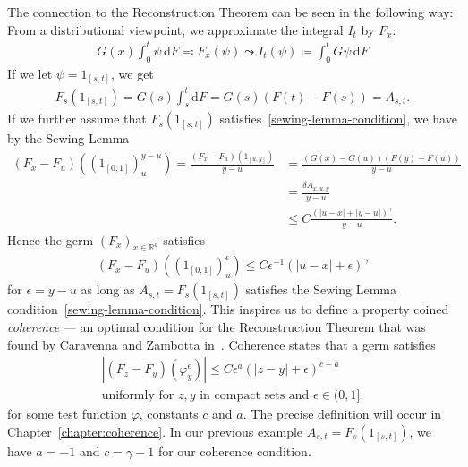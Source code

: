 The connection to the Reconstruction Theorem can be seen in the following way: From a distributional viewpoint, we approximate the integral \(I_t\) by \(F_x\): 
\begin{align*}
    G(x)\int^t_0 \psi \, \mathrm{d}F \eqqcolon F_x(\psi)  \leadsto I_t(\psi) \coloneqq \int^t_0 G \psi \, \mathrm{d}F
\end{align*}
If we let \(\psi = 1_{[s,t]}\), we get
\begin{align*}
    F_s(1_{[s,t]}) = G(s) \int^t_s \mathrm{d}F = G(s)(F(t) - F(s)) = A_{s,t}.
\end{align*}
If we further assume that \(F_s(1_{[s,t]})\) satisfies~\eqref{sewing-lemma-condition}, we have by the Sewing Lemma
\begin{align*}
    (F_x - F_u)({(1_{[0,1]})}^{y-u}_u) = \frac{(F_x - F_u)(1_{[u,y]})}{y-u} &= \frac{(G(x) - G(u))(F(y) - F(u))}{y-u} \\
    &= \frac{\delta A_{x,u,y}}{y-u}\\
    &\leq C \frac{ {(|u-x| + |y-u|)}^\gamma}{y-u}.
\end{align*} 
Hence the germ \({(F_x)}_{x \in \mathbb{R}^d}\) satisfies 
\begin{align*}
    (F_x - F_u)({(1_{[0,1]})}^{\epsilon}_u) \leq C \epsilon^{-1}{(|u-x| + \epsilon)}^\gamma
\end{align*}
for \(\epsilon = y-u\) as long as \(A_{s,t} = F_s(1_{[s,t]})\) satisfies the Sewing Lemma condition~\eqref{sewing-lemma-condition}. This inspires us to define a property coined \emph{coherence} --- an optimal condition for the Reconstruction Theorem that was found by Caravenna and Zambotta in~\cite{caravenna2021hairer}. Coherence states that a germ satisfies
\begin{gather}\label{pre-condition-coherence}
    |(F_z - F_y)(\varphi^\epsilon_y)| \leq C\epsilon^{a}{(|z-y| + \epsilon)}^{c - a}  \\ \text{uniformly for \(z,y\) in compact sets and \(\epsilon \in (0,1]\)} \nonumber. %
\end{gather}
for some test function \(\varphi\), constants  \(c\) and \(a\).
The precise definition will occur in Chapter~\ref{chapter:coherence}. In our previous example \(A_{s,t} = F_s(1_{[s,t]})\), we have \(a = -1\) and \(c = \gamma - 1\) for our coherence condition. 

